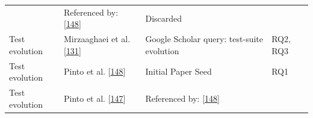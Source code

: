 \documentclass[]{book}
\begin{document}
\begin{longtable}[]{@{}llll@{}}
\begin{minipage}[t]{0.16\columnwidth}
\end{minipage} & \begin{minipage}[t]{0.50\columnwidth}\raggedright\strut
Referenced by:
{[}\protect\hyperlink{ref-pinto2012understanding}{148}{]}\strut
\end{minipage} & \begin{minipage}[t]{0.04\columnwidth}\raggedright\strut
Discarded\strut
\end{minipage}\tabularnewline
\begin{minipage}[t]{0.18\columnwidth}\raggedright\strut
Test evolution\strut
\end{minipage} & \begin{minipage}[t]{0.16\columnwidth}\raggedright\strut
Mirzaaghaei et al.
{[}\protect\hyperlink{ref-supportingtestsuite}{131}{]}\strut
\end{minipage} & \begin{minipage}[t]{0.50\columnwidth}\raggedright\strut
Google Scholar query: test-suite evolution\strut
\end{minipage} & \begin{minipage}[t]{0.04\columnwidth}\raggedright\strut
RQ2, RQ3\strut
\end{minipage}\tabularnewline
\begin{minipage}[t]{0.18\columnwidth}\raggedright\strut
Test evolution\strut
\end{minipage} & \begin{minipage}[t]{0.16\columnwidth}\raggedright\strut
Pinto et al.
{[}\protect\hyperlink{ref-pinto2012understanding}{148}{]}\strut
\end{minipage} & \begin{minipage}[t]{0.50\columnwidth}\raggedright\strut
Initial Paper Seed\strut
\end{minipage} & \begin{minipage}[t]{0.04\columnwidth}\raggedright\strut
RQ1\strut
\end{minipage}\tabularnewline
\begin{minipage}[t]{0.18\columnwidth}\raggedright\strut
Test evolution\strut
\end{minipage} & \begin{minipage}[t]{0.16\columnwidth}\raggedright\strut
Pinto et al. {[}\protect\hyperlink{ref-pinto2013}{147}{]}\strut
\end{minipage} & \begin{minipage}[t]{0.50\columnwidth}\raggedright\strut
Referenced by:
{[}\protect\hyperlink{ref-pinto2012understanding}{148}{]}\strut
\end{minipage} & \begin{minipage}[t]{0.04\columnwidth}\raggedright\strut

\end{minipage}
\end{longtable}
\end{document}
